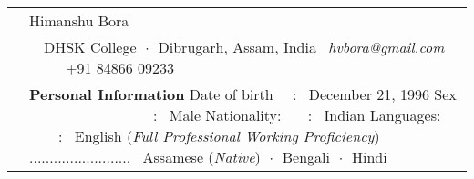 \documentclass[a4paper, 11pt]{article}
\newenvironment{SectionTable}[1]{
	\renewcommand*{\arraystretch}{1.7}
	\setlength{\tabcolsep}{10pt}
	\begin{longtable}{Rp{5.2in}} & #1 \\}
{\end{longtable}\vspace{-.3cm}}
\begin{document}

\begin{SectionTable}{\Huge \color{Peach} Himanshu Bora}
& 
\faMapMarker \ \ DHSK College $\;\boldsymbol{\cdot}\;$ Dibrugarh, Assam, India \newline
\faEnvelopeO \  \textit{hvbora@gmail.com} \ \ \ \  \faPhone \ +91 84866 09233 \\
&
{\textbf {Personal Information}} \newline
Date of birth \ \ : \ December 21, 1996 \newline
Sex \ \ \ \ \ \ \ \ \ \ \ \ \ \ \ \ \ : \ Male \newline
Nationality: \ \ \ : \ Indian \newline
Languages: \ \ \ \ : \ English (\textit{Full Professional Working Proficiency}) \newline 
{\color{white} .........................} \ Assamese (\textit{Native}) $\;\boldsymbol{\cdot}\;$ Bengali $\;\boldsymbol{\cdot}\;$ Hindi 
\end{SectionTable}
\end{document}
